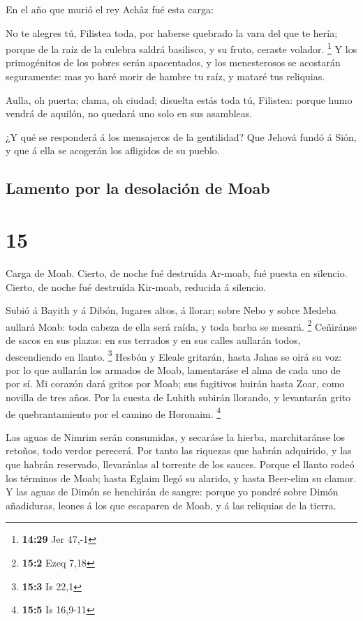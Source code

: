  En el año que murió el rey Achâz fué esta carga:

 No te alegres tú, Filistea toda, por haberse quebrado la
vara del que te hería; porque de la raíz de la culebra saldrá basilisco,
y su fruto, ceraste volador. \footnote{\textbf{14:29} Jer 47,-1}
 Y los primogénitos de los pobres serán apacentados, y los
menesterosos se acostarán seguramente: mas yo haré morir de hambre tu
raíz, y mataré tus reliquias.

 Aulla, oh puerta; clama, oh ciudad; disuelta estás toda
tú, Filistea: porque humo vendrá de aquilón, no quedará uno solo en sus
asambleas.

 ¿Y qué se responderá á los mensajeros de la gentilidad?
Que Jehová fundó á Sión, y que á ella se acogerán los afligidos de su
pueblo.

\hypertarget{lamento-por-la-desolaciuxf3n-de-moab}{%
\subsection{Lamento por la desolación de
Moab}\label{lamento-por-la-desolaciuxf3n-de-moab}}

\hypertarget{section-14}{%
\section{15}\label{section-14}}

 Carga de Moab. Cierto, de noche fué destruída Ar-moab, fué
puesta en silencio. Cierto, de noche fué destruída Kir-moab, reducida á
silencio.

 Subió á Bayith y á Dibón, lugares altos, á llorar; sobre
Nebo y sobre Medeba aullará Moab: toda cabeza de ella será raída, y toda
barba se mesará. \footnote{\textbf{15:2} Ezeq 7,18} 
Ceñiránse de sacos en sus plazas: en sus terrados y en sus calles
aullarán todos, descendiendo en llanto. \footnote{\textbf{15:3} Is 22,1}
 Hesbón y Eleale gritarán, hasta Jahas se oirá su voz: por
lo que aullarán los armados de Moab, lamentaráse el alma de cada uno de
por sí.  Mi corazón dará gritos por Moab; sus fugitivos
huirán hasta Zoar, como novilla de tres años. Por la cuesta de Luhith
subirán llorando, y levantarán grito de quebrantamiento por el camino de
Horonaim. \footnote{\textbf{15:5} Is 16,9-11}

 Las aguas de Nimrim serán consumidas, y secaráse la hierba,
marchitaránse los retoños, todo verdor perecerá.  Por tanto
las riquezas que habrán adquirido, y las que habrán reservado,
llevaránlas al torrente de los sauces.  Porque el llanto
rodeó los términos de Moab; hasta Eglaim llegó su alarido, y hasta
Beer-elim su clamor.  Y las aguas de Dimón se henchirán de
sangre: porque yo pondré sobre Dimón añadiduras, leones á los que
escaparen de Moab, y á las reliquias de la tierra.

